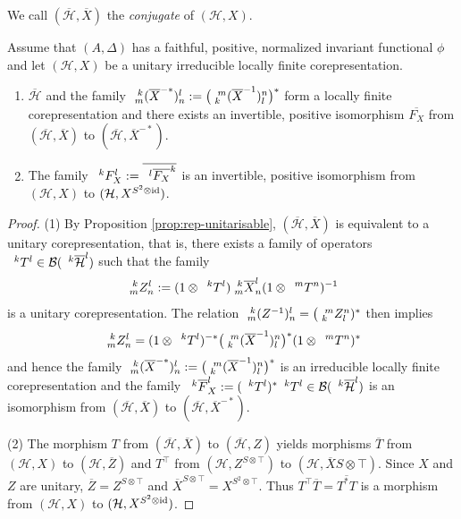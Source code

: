We call $(\overline{\mathcal{H}},\overline{X})$ the \emph{conjugate} of 
$(\mathcal{H},X)$.   
\begin{Prop} \label{prop:rep-f}
  Assume that $(A,\Delta)$ has a faithful, positive, normalized
  invariant functional $\phi$ and let $(\mathcal{H},X)$ be a unitary
  irreducible locally finite corepresentation. 
  \begin{enumerate}
  \item $\overline{\mathcal{H}}$ and the family
    $\Gr{(\overline{X}^{-*})}{k}{l}{m}{n}:=\big(\Gr{(\overline{X}^{-1})}{m}{n}{k}{l}\big)^{*}$
    form a locally finite corepresentation and there
    exists an invertible, positive isomorphism $\overline{F_{X}}$ from
    $(\overline{\mathcal{H}},\overline{X})$ to
    $(\overline{\mathcal{H}},\overline{X}^{-*})$.
  \item The family
    $\Gru{F_{X}}{k}{l}:=\overline{\Gru{\overline{F_{X}}}{l}{k}}$ is an
    invertible, positive isomorphism from $(\mathcal{H},X)$ to
    $(\mathcal{H},X^{S^{2} \otimes \id})$.
  \end{enumerate}
\end{Prop}
\begin{proof}
(1) By Proposition \ref{prop:rep-unitarisable},
$(\overline{\mathcal{H}},\overline{X})$ is equivalent to a unitary
corepresentation, that is, there exists a family of operators
$\Gru{T}{k}{l} \in \mathcal{B}(\Gru{\overline{\mathcal{H}}}{k}{l})$
such that the family 
\begin{align*}
\Gr{Z}{k}{l}{m}{n}:= (1 \otimes
\Gru{T}{k}{l})\Gr{\overline{X}}{k}{l}{m}{n}(1 \otimes
\Gru{T}{m}{n})^{-1} 
\end{align*}
 is a unitary corepresentation. The relation
 $\Gr{(Z^{-1})}{k}{l}{m}{n}=\big(\Gr{Z}{m}{n}{k}{l})^{*}$ then implies
 \begin{align*}
   \Gr{Z}{k}{l}{m}{n} = (1 \otimes
   \Gru{T}{k}{l})^{-*}\big(\Gr{(\overline{X}^{-1})}{m}{n}{k}{l}\big)^{*}(1
   \otimes \Gru{T}{m}{n})^{*}
 \end{align*}
 and hence the family 
 $\Gr{(\overline{X}^{-*})}{k}{l}{m}{n}:=\big(\Gr{(\overline{X}^{-1})}{m}{n}{k}{l}\big)^{*}$
 is an irreducible locally finite corepresentation and the family
 $\Gru{\overline{F}_{X}}{k}{l}:=(\Gru{T}{k}{l})^{*}\Gru{T}{k}{l} \in
  \mathcal{B}(\Gru{\overline{\mathcal{H}}}{k}{l})$
is an isomorphism from $(\overline{\mathcal{H}},\overline{X})$ to
$(\overline{\mathcal{H}},\overline{X}^{-*})$.   

(2) The morphism $T$  from $(\overline{\mathcal{H}},\overline{X})$  to
$(\overline{\mathcal{H}},Z)$ yields morphisms $\overline{T}$ from
$(\mathcal{H},X)$ to $(\mathcal{H},\overline{Z})$ and $T^{\top}$ from $(\mathcal{H},Z^{S\otimes\top})$ to
$(\mathcal{H},\overline{X}{S \otimes \top})$. Since $X$ and $Z$ are
unitary, $\overline{Z}=Z^{S\otimes \top}$ and  $\overline{X}^{S \otimes
  \top} = X^{S^{2} \otimes \top}$. Thus $T^{\top}\overline{T} =
\overline{T^{*}T}$ is a morphism from $(\mathcal{H},X)$ to
$(\mathcal{H},X^{S^{2}\otimes \id})$.
\end{proof}
